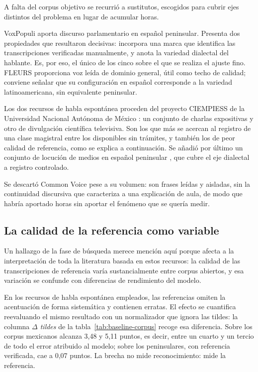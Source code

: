 A falta del corpus objetivo se recurrió a sustitutos, escogidos para cubrir ejes distintos
del problema en lugar de acumular horas.

VoxPopuli \cite{wang2021voxpopuli} aporta discurso parlamentario en español peninsular.
Presenta dos propiedades que resultaron decisivas: incorpora una marca que identifica las
transcripciones verificadas manualmente, y anota la variedad dialectal del hablante. Es,
por eso, el único de los cinco sobre el que se realiza el ajuste fino.
FLEURS \cite{conneau2022fleurs} proporciona voz leída de dominio general, útil como techo
de calidad; conviene señalar que su configuración en español corresponde a la variedad
latinoamericana, sin equivalente peninsular.

Los dos recursos de habla espontánea proceden del proyecto CIEMPIESS de la Universidad
Nacional Autónoma de México \cite{hernandezmena2014ciempiess}: un conjunto de charlas
expositivas y otro de divulgación científica televisiva. Son los que más se acercan al
registro de una clase magistral entre los disponibles sin trámites, y también los de peor
calidad de referencia, como se explica a continuación. Se añadió por último un conjunto de
locución de medios en español peninsular \cite{kolobov2021mediaspeech}, que cubre el eje
dialectal a registro controlado.

Se descartó Common Voice \cite{ardila2020commonvoice} pese a su volumen: son frases leídas
y aisladas, sin la continuidad discursiva que caracteriza a una explicación de aula, de modo
que habría aportado horas sin aportar el fenómeno que se quería medir.

\subsection{La calidad de la referencia como variable}

Un hallazgo de la fase de búsqueda merece mención aquí porque afecta a la interpretación de
toda la literatura basada en estos recursos: la calidad de las transcripciones de
referencia varía sustancialmente entre corpus abiertos, y esa variación se confunde con
diferencias de rendimiento del modelo.

En los recursos de habla espontánea empleados, las referencias omiten la acentuación de
forma sistemática y contienen erratas. El efecto se cuantifica reevaluando el mismo
resultado con un normalizador que ignora las tildes: la columna \emph{$\Delta$ tildes} de la
tabla~\ref{tab:baseline-corpus} recoge esa diferencia. Sobre los corpus mexicanos alcanza
3,48 y 5,11 puntos, es decir, entre un cuarto y un tercio de todo el error atribuido al
modelo; sobre los peninsulares, con referencia verificada, cae a 0,07 puntos. La brecha no
mide reconocimiento: mide la referencia.

